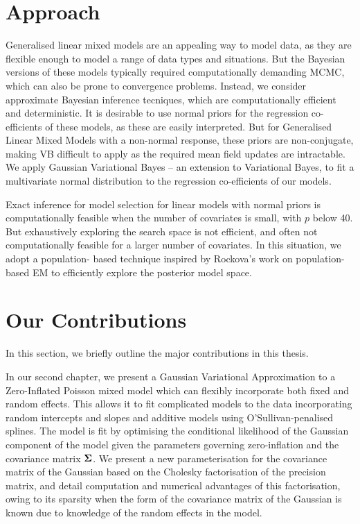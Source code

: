 \section{Approach}

Generalised linear mixed models are an appealing way to model data, as they are flexible enough to model a
range of data types and situations. But the Bayesian versions of these models typically required 
computationally demanding MCMC, which can also be prone to convergence problems. Instead, we consider approximate Bayesian inference tecniques, which are computationally efficient and deterministic. It is
desirable to use normal priors for the regression co-efficients of these models, as these are easily
interpreted. But for Generalised Linear Mixed Models with a non-normal response, these priors are
non-conjugate, making VB difficult to apply as the required mean field updates are intractable. We apply
Gaussian Variational Bayes -- an extension to Variational Bayes, to fit a multivariate normal distribution
to the regression co-efficients of our models.

Exact inference for model selection for linear models with normal priors is computationally feasible when the
number of  covariates is small, with $p$ below 40. But exhaustively exploring the search space is not
efficient, and often not computationally feasible for a larger number of covariates. In this situation, we
adopt a population- based technique inspired by Rockova's work on population-based EM to efficiently explore
the posterior model space.

\section{Our Contributions}

In this section, we briefly outline the major contributions in this thesis.

In our second chapter, we present a Gaussian Variational Approximation to a Zero-Inflated Poisson mixed model
which can flexibly incorporate both fixed and random effects. This allows it to fit complicated models
to the data incorporating random intercepts and slopes and additive models using O'Sullivan-penalised splines.
The model is fit by optimising the conditional likelihood of the Gaussian component of the model given the
parameters governing zero-inflation and the covariance matrix ${\boldsymbol \Sigma}$.
We present a new parameterisation for the covariance matrix of the Gaussian based on the Cholesky
factorisation of the precision matrix, and detail computation and numerical advantages of this
factorisation, owing to its sparsity when the form of the covariance matrix of the Gaussian is known due to
knowledge of the random effects in the model.


